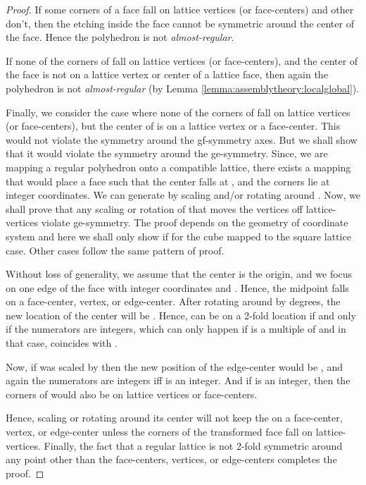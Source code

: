 \documentclass[11pt]{article}
\newcommand{\1}{\mathds{1}}
\begin{document}
\begin{proof}
 If some corners of a face  fall on lattice vertices (or face-centers) and other don't, then the etching inside the face cannot be symmetric around the center of the face. Hence the polyhedron is not \emph{almost-regular}.

 If none of the corners of  fall on lattice vertices (or face-centers), and the center of the face is not on a lattice vertex or center of a lattice face, then again the polyhedron is not \emph{almost-regular} (by Lemma \ref{lemma:assemblytheory:localglobal}). 

 Finally, we consider the case where none of the corners of  fall on lattice vertices (or face-centers), but the center  of  is on a lattice vertex or a face-center. This would not violate the symmetry around the gf-symmetry axes. But we shall show that it would violate the symmetry around the ge-symmetry. Since, we are mapping a regular polyhedron onto a compatible lattice, there exists a mapping that would place a face  such that the center falls at , and the corners lie at integer coordinates. We can generate  by scaling and/or rotating  around . Now, we shall prove that any scaling or rotation of  that moves the vertices off lattice-vertices violate ge-symmetry. The proof depends on the geometry of coordinate system and here we shall only show if for the cube mapped to the square lattice case. Other cases follow the same pattern of proof.

 Without loss of generality, we assume that the center  is the origin, and we focus on one edge  of the face  with integer coordinates  and . Hence, the midpoint  falls on a face-center, vertex, or edge-center. After rotating around  by  degrees, the new location of the center will be . Hence,  can be on a 2-fold location if and only if the numerators are integers, which can only happen if  is a multiple of  and in that case,  coincides with . 

 Now, if  was scaled by  then the new position of the edge-center  would be , and again the numerators are integers iff  is an integer. And if  is an integer, then the corners of  would also be on lattice vertices or face-centers.

 Hence, scaling or rotating  around its center  will not keep the  on a face-center, vertex, or edge-center unless the corners of the transformed face  fall on lattice-vertices. Finally, the fact that a regular lattice is not 2-fold symmetric around any point other than the face-centers, vertices, or edge-centers completes the proof.
\end{proof}
\end{document}

